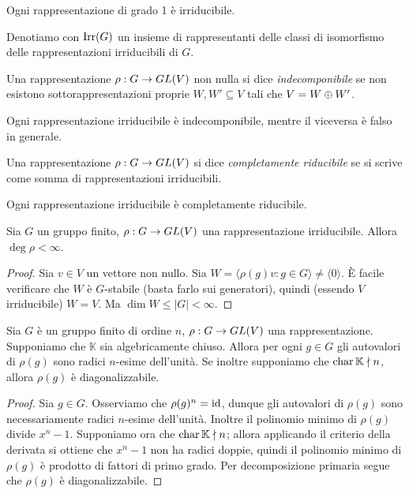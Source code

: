 \begin{example}
Ogni rappresentazione di grado 1 è irriducibile.
\end{example}

Denotiamo con $\operatorname{Irr}(G)$ un insieme di rappresentanti delle classi di isomorfismo delle rappresentazioni irriducibili di $G$.

\begin{definition}
Una rappresentazione $\rho:G\to GL(V)$ non nulla si dice \emph{indecomponibile} se non esistono sottorappresentazioni proprie $W\comma W'\subseteq V$ tali che $V=W\oplus W'$.
\end{definition}

\begin{remark}
Ogni rappresentazione irriducibile è indecomponibile, mentre il viceversa è falso in generale.
\end{remark}

\begin{definition}
Una rappresentazione $\rho:G\to GL(V)$ si dice \emph{completamente riducibile} se si scrive come somma di rappresentazioni irriducibili.
\end{definition}

\begin{example}
Ogni rappresentazione irriducibile è completamente riducibile.
\end{example}

\begin{proposition}
Sia $G$ un gruppo finito, $\rho:G\to GL(V)$ una rappresentazione irriducibile. Allora $\deg\rho<\infty$.
\end{proposition}
\begin{proof}
Sia $v\in V$ un vettore non nullo. Sia $W=\langle\rho(g)v:g\in G\rangle\neq\langle 0\rangle$. È facile verificare che $W$ è $G$-stabile (basta farlo sui generatori), quindi (essendo $V$ irriducibile) $W=V$. Ma $\dim W\le|G|<\infty$.
\end{proof}

\begin{proposition}
Sia $G$ è un gruppo finito di ordine $n$, $\rho:G\to GL(V)$ una rappresentazione. Supponiamo che $\mathbb{K}$ sia algebricamente chiuso. Allora per ogni $g\in G$ gli autovalori di $\rho(g)$ sono radici $n$-esime dell'unità. Se inoltre supponiamo che $\operatorname{char}\mathbb{K}\nmid n$, allora $\rho(g)$ è diagonalizzabile.
\end{proposition}
\begin{proof}
Sia $g\in G$. Osserviamo che $\rho(g)^n=\operatorname{id}$, dunque gli autovalori di $\rho(g)$ sono necessariamente radici $n$-esime dell'unità. Inoltre il polinomio minimo di $\rho(g)$ divide $x^n-1$. Supponiamo ora che $\operatorname{char}\mathbb{K}\nmid n$; allora applicando il criterio della derivata si ottiene che $x^n-1$ non ha radici doppie, quindi il polinomio minimo di $\rho(g)$ è prodotto di fattori di primo grado. Per decomposizione primaria segue che $\rho(g)$ è diagonalizzabile.
\end{proof}


